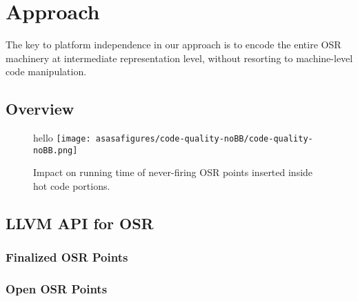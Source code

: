 \section{Approach}
\label{se:approach}

The key to platform independence in our approach is to encode the entire OSR machinery at intermediate representation level, without resorting to machine-level code manipulation.

\subsection{Overview}

\begin{figure}[h!]
\begin{center}
hello
\texttt{[image: asasafigures/code-quality-noBB/code-quality-noBB.png]}
\caption{\label{fig:code-quality} Impact on running time of never-firing OSR points inserted inside hot code portions.}
\end{center}
\end{figure}

%
%

\subsection{LLVM API for OSR}

\subsubsection{Finalized OSR Points}

\subsubsection{Open OSR Points}


  
  
  
  
  
  
  
  
  
  
  
  
  
  
  
  